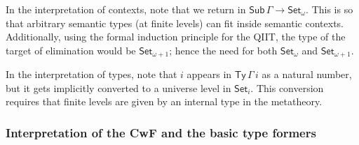 \documentclass[acmsmall,screen,review,anonymous]{acmart}
\newcommand{\msf}[1]{{\mathsf{#1}}}
\newcommand{\Set}{\msf{Set}}
\newcommand{\Sub}{\msf{Sub}}
\newcommand{\Ty}{\msf{Ty}}
\begin{document}
In the interpretation of contexts, note that we return in $\Sub\,\Gamma \to \Set_\omega$. This is so
that arbitrary semantic types (at finite levels) can fit inside semantic contexts. Additionally,
using the formal induction principle for the QIIT, the type of the target of elimination would be
$\Set_{\omega+1}$; hence the need for both $\Set_\omega$ and $\Set_{\omega+1}$.

In the interpretation of types, note that $i$ appears in $\Ty\,\Gamma\,i$ as a natural number,
but it gets implicitly converted to a universe level in $\Set_i$. This conversion requires that
finite levels are given by an internal type in the metatheory.

\subsubsection{Interpretation of the CwF and the basic type formers}
\end{document}
